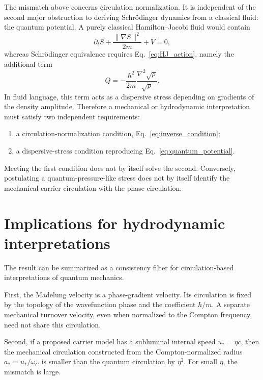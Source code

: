 \documentclass[11pt,a4paper]{article}
\newcommand{\omegaC}{\omega_{C}}
\newcommand{\uStar}{u_{*}}
\newcommand{\aStar}{a_{*}}
\begin{document}
The mismatch above concerns circulation normalization. It is independent of the second major obstruction to deriving Schr\"odinger dynamics from a classical fluid: the quantum potential. A purely classical Hamilton--Jacobi fluid would contain
\begin{equation}
    \partial_t S+\frac{\lVert\nabla S\rVert^2}{2m}+V=0,
\end{equation}
whereas Schr\"odinger equivalence requires Eq.~\eqref{eq:HJ_action}, namely the additional term
\begin{equation}
    Q
    =
    -\frac{\hbar^2}{2m}
    \frac{\nabla^2\sqrt{\rho}}{\sqrt{\rho}}.
\end{equation}
In fluid language, this term acts as a dispersive stress depending on gradients of the density amplitude. Therefore a mechanical or hydrodynamic interpretation must satisfy two independent requirements:
\begin{enumerate}
    \item a circulation-normalization condition, Eq.~\eqref{eq:inverse_condition};
    \item a dispersive-stress condition reproducing Eq.~\eqref{eq:quantum_potential}.
\end{enumerate}
Meeting the first condition does not by itself solve the second. Conversely, postulating a quantum-pressure-like stress does not by itself identify the mechanical carrier circulation with the phase circulation.

\section{Implications for hydrodynamic interpretations}

The result can be summarized as a consistency filter for circulation-based interpretations of quantum mechanics.

First, the Madelung velocity is a phase-gradient velocity. Its circulation is fixed by the topology of the wavefunction phase and the coefficient $\hbar/m$. A separate mechanical turnover velocity, even when normalized to the Compton frequency, need not share this circulation.

Second, if a proposed carrier model has a subluminal internal speed $\uStar=\eta c$, then the mechanical circulation constructed from the Compton-normalized radius $\aStar=\uStar/\omegaC$ is smaller than the quantum circulation by $\eta^2$. For small $\eta$, the mismatch is large.
\end{document}
